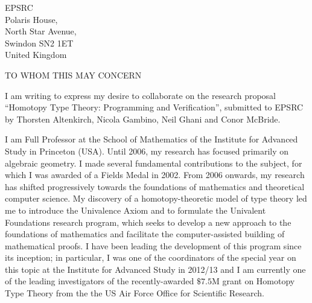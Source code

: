 \documentclass[10pt,a4paper,oneside]{iasletter}
\date{July 7th, 2014}
\begin{document}
\begin{letter}{
EPSRC \\
Polaris House, \\
North Star Avenue, \\
Swindon SN2 1ET\\
United Kingdom}

\opening{TO WHOM THIS MAY CONCERN}

I am writing to express my desire to collaborate on the research proposal
``Homotopy Type Theory: Programming and Verification'', submitted to
EPSRC by Thorsten Altenkirch, Nicola Gambino, Neil Ghani and Conor
McBride. 

I am Full Professor at the School of Mathematics of the Institute for
Advanced Study in Princeton (USA).  Until 2006, my research has
focused primarily on algebraic geometry. I made several fundamental
contributions to the subject, for which I was awarded of a Fields
Medal in 2002. From 2006 onwards, my research has shifted
progressively towards the foundations of mathematics and theoretical
computer science. My discovery of a homotopy-theoretic model of type
theory led me to introduce the Univalence Axiom and to formulate the
Univalent Foundations research program, which seeks to develop a new
approach to the foundations of mathematics and facilitate the
computer-assisted building of mathematical proofs. I have been
leading the development of this program since its inception; in
particular, I was one of the coordinators of the special year on this
topic at the Institute for Advanced Study in 2012/13 and I am
currently one of the leading investigators of the recently-awarded
$\$7.5$M grant on Homotopy Type Theory from the the US Air Force
Office for Scientific Research.


\end{letter}
\end{document}

